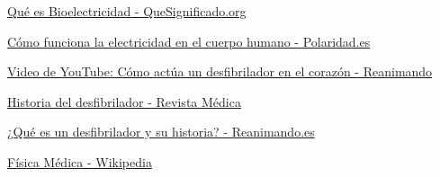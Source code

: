 \begin{thebibliography}{99}
  \href{https://quesignificado.org/que-es-bioelectricidad/}{Qué es Bioelectricidad - QueSignificado.org}
  
  \href{https://polaridad.es/como-funciona-la-electricidad-en-el-cuerpo-humano/}{Cómo funciona la electricidad en el cuerpo humano - Polaridad.es}
  
  \href{https://www.youtube.com/watch?v=KSNYlNGJkC8}{Video de YouTube: Cómo actúa un desfibrilador en el corazón - Reanimando}
  
  \href{https://revistamedica.com/historia-desfibrilador/}{Historia del desfibrilador - Revista Médica}
  
  \href{https://reanimando.es/2022/01/23/que-es-un-desfibrilador-y-su-historia/}{¿Qué es un desfibrilador y su historia? - Reanimando.es}
  
  \href{https://es.wikipedia.org/wiki/F\%C3\%ADsica_m\%C3\%A9dica}{Física Médica - Wikipedia}
  
\end{thebibliography}
  